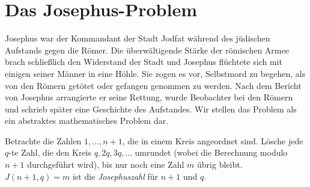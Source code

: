 
\section{Das Josephus-Problem}\label{s.josephus}


Josephus war der Kommandant der Stadt Jodfat während des jüdischen Aufstands gegen die Römer. Die überwältigende Stärke der römischen Armee brach schließlich den Widerstand der Stadt und Josephus flüchtete sich mit einigen seiner Männer in eine Höhle. Sie zogen es vor, Selbstmord zu begehen, als von den Römern getötet oder gefangen genommen zu werden. Nach dem Bericht von Josephus arrangierte er seine Rettung, wurde Beobachter bei den Römern und schrieb später eine Geschichte des Aufstandes. Wir stellen das Problem als ein abstraktes mathematisches Problem dar.

\begin{definition}
Betrachte die Zahlen $1,\ldots,n\!+\!1$, die in einem Kreis angeordnet sind. Lösche jede $q$-te Zahl, die den Kreis $q, 2q, 3q, \ldots$ umrundet (wobei die Berechnung modulo $n\!+\!1$ durchgeführt wird), bis nur noch eine Zahl $m$ übrig bleibt. $J(n+1,q)=m$ ist die \emph{Josephuszahl} für $n+1$ und $q$.
\end{definition}

